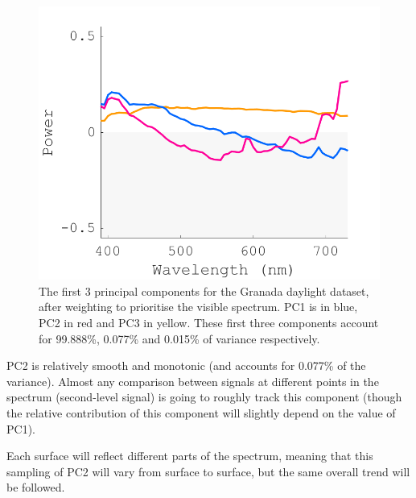 \begin{figure}[htbp]
 \includegraphics[max width=\textwidth]{figs/comp/melcomp_3/8.png} %
 \caption{The first 3 principal components for the Granada daylight dataset, after weighting to prioritise the visible spectrum. PC1 is in blue, PC2 in red and PC3 in yellow. These first three components account for 99.888\%, 0.077\% and 0.015\% of variance respectively.}
 \label{fig:PCA}
\end{figure} 

\Gls{PC2} is relatively smooth and monotonic (and accounts for 0.077\% of the variance). Almost any comparison between signals at different points in the spectrum (second-level signal) is going to roughly track this component (though the relative contribution of this component will slightly depend on the value of \gls{PC1}).


Each surface will reflect different parts of the spectrum, meaning that this sampling of \gls{PC2} will vary from surface to surface, but the same overall trend will be followed.



